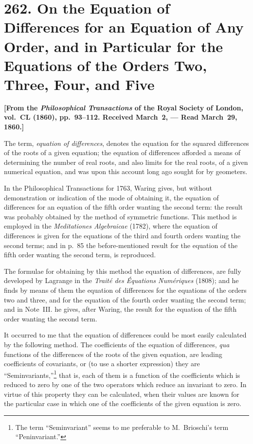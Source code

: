 \documentclass[11pt,a4paper]{book}
\begin{document}
\newpage
\section[262. On the Equation of Differences]{262. On the Equation of Differences for an Equation of Any Order, and in Particular for the Equations of the Orders Two, Three, Four, and Five}

\textbf{[From the \textit{Philosophical Transactions} of the Royal Society of London, vol.~CL (1860), pp.~93--112. Received March~2, --- Read March~29, 1860.]}

The term, \textit{equation of differences}, denotes the equation for the squared differences of the roots of a given equation; the equation of differences afforded a means of determining the number of real roots, and also limits for the real roots, of a given numerical equation, and was upon this account long ago sought for by geometers.

In the Philosophical Transactions for 1763, Waring gives, but without demonstration or indication of the mode of obtaining it, the equation of differences for an equation of the fifth order wanting the second term: the result was probably obtained by the method of symmetric functions. This method is employed in the \textit{Meditationes Algebraicae} (1782), where the equation of differences is given for the equations of the third and fourth orders wanting the second terms; and in p.~85 the before-mentioned result for the equation of the fifth order wanting the second term, is reproduced.

The formulae for obtaining by this method the equation of differences, are fully developed by Lagrange in the \textit{Trait\'{e} des \'{E}quations Num\'{e}riques} (1808); and he finds by means of them the equation of differences for the equations of the orders two and three, and for the equation of the fourth order wanting the second term; and in Note~III. he gives, after Waring, the result for the equation of the fifth order wanting the second term.

It occurred to me that the equation of differences could be most easily calculated by the following method. The coefficients of the equation of differences, \textit{qua} functions of the differences of the roots of the given equation, are leading coefficients of covariants, or (to use a shorter expression) they are ``Seminvariants,''\footnote{The term ``Seminvariant'' seems to me preferable to M.~Brioschi's term ``Peninvariant.''} that is, each of them is a function of the coefficients which is reduced to zero by one of the two operators which reduce an invariant to zero. In virtue of this property they can be calculated, when their values are known for the particular case in which one of the coefficients of the given equation is zero.
\end{document}
